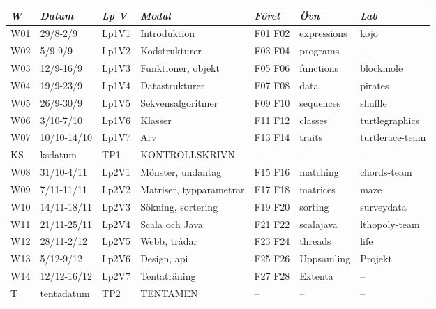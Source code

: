 \begin{tabular}{l|l|l|l|l|l|l}
\textit{W} & \textit{Datum} & \textit{Lp V} & \textit{Modul} & \textit{Förel} & \textit{Övn} & \textit{Lab} \\ \hline \hline
W01 & 29/8-2/9 & Lp1V1 & Introduktion & F01 F02 & expressions & kojo \\
W02 & 5/9-9/9 & Lp1V2 & Kodstrukturer & F03 F04 & programs & -- \\
W03 & 12/9-16/9 & Lp1V3 & Funktioner, objekt & F05 F06 & functions & blockmole \\
W04 & 19/9-23/9 & Lp1V4 & Datastrukturer & F07 F08 & data & pirates \\
W05 & 26/9-30/9 & Lp1V5 & Sekvensalgoritmer & F09 F10 & sequences & shuffle \\
W06 & 3/10-7/10 & Lp1V6 & Klasser & F11 F12 & classes & turtlegraphics \\
W07 & 10/10-14/10 & Lp1V7 & Arv & F13 F14 & traits & turtlerace-team \\
KS & ksdatum & TP1 & KONTROLLSKRIVN. & -- & -- & -- \\
W08 & 31/10-4/11 & Lp2V1 & Mönster, undantag & F15 F16 & matching & chords-team \\
W09 & 7/11-11/11 & Lp2V2 & Matriser, typparametrar & F17 F18 & matrices & maze \\
W10 & 14/11-18/11 & Lp2V3 & Sökning, sortering & F19 F20 & sorting & surveydata \\
W11 & 21/11-25/11 & Lp2V4 & Scala och Java & F21 F22 & scalajava & lthopoly-team \\
W12 & 28/11-2/12 & Lp2V5 & Webb, trådar & F23 F24 & threads & life \\
W13 & 5/12-9/12 & Lp2V6 & Design, api & F25 F26 & Uppsamling & Projekt \\
W14 & 12/12-16/12 & Lp2V7 & Tentaträning & F27 F28 & Extenta & -- \\
T & tentadatum & TP2 & TENTAMEN & -- & -- & -- \\
\end{tabular}
